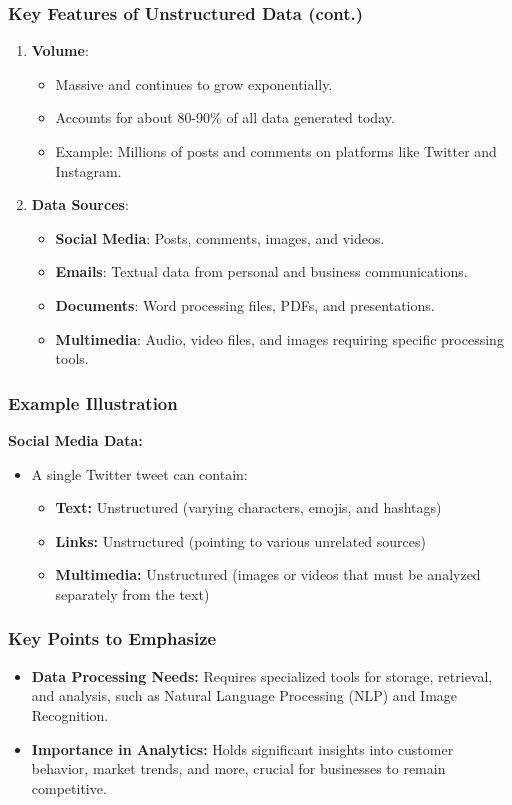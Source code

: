 \documentclass{beamer}
\begin{document}
\begin{frame}[fragile]
    \frametitle{Key Features of Unstructured Data (cont.)}
    \begin{enumerate}[resume]
        \item \textbf{Volume}:
        \begin{itemize}
            \item Massive and continues to grow exponentially.
            \item Accounts for about 80-90\% of all data generated today.
            \item Example: Millions of posts and comments on platforms like Twitter and Instagram.
        \end{itemize}
        \item \textbf{Data Sources}:
        \begin{itemize}
            \item \textbf{Social Media}: Posts, comments, images, and videos.
            \item \textbf{Emails}: Textual data from personal and business communications.
            \item \textbf{Documents}: Word processing files, PDFs, and presentations.
            \item \textbf{Multimedia}: Audio, video files, and images requiring specific processing tools.
        \end{itemize}
    \end{enumerate}
\end{frame}

\begin{frame}[fragile]
    \frametitle{Example Illustration}
    \textbf{Social Media Data:}
    \begin{itemize}
        \item A single Twitter tweet can contain:
        \begin{itemize}
            \item \textbf{Text:} Unstructured (varying characters, emojis, and hashtags)
            \item \textbf{Links:} Unstructured (pointing to various unrelated sources)
            \item \textbf{Multimedia:} Unstructured (images or videos that must be analyzed separately from the text)
        \end{itemize}
    \end{itemize}
\end{frame}

\begin{frame}[fragile]
    \frametitle{Key Points to Emphasize}
    \begin{itemize}
        \item \textbf{Data Processing Needs:} Requires specialized tools for storage, retrieval, and analysis, such as Natural Language Processing (NLP) and Image Recognition.
        
        \item \textbf{Importance in Analytics:} Holds significant insights into customer behavior, market trends, and more, crucial for businesses to remain competitive.
    \end{itemize}
\end{frame}
\end{document}
